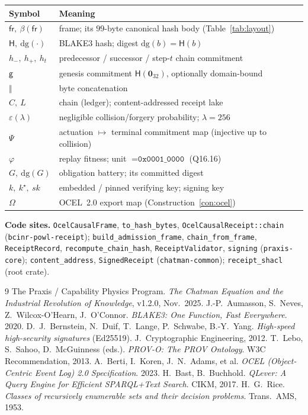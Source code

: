 \documentclass[11pt,oneside]{book}
\theoremstyle{definition}
\theoremstyle{plain}
\theoremstyle{remark}
\newcommand{\chainH}{\mathsf{H}}               %
\newcommand{\Fitness}{\varphi}
\newcommand{\dg}{\mathrm{dg}}                   %
\newcommand{\fr}{\mathsf{fr}}                   %
\newcommand{\body}{\beta}                       %
\newcommand{\code}[1]{\texttt{#1}}
\newcommand{\concat}{\mathbin{\Vert}}           %
\newcommand{\Genesis}{\mathsf{g}}               %
\newcommand{\Lake}{L}                 %
\newcommand{\Ledger}{C}               %
\begin{document}
\begin{tabular}{ll}
\toprule
Symbol & Meaning\\
\midrule
$\fr,\ \body(\fr)$ & frame; its $99$-byte canonical hash body (Table~\ref{tab:layout})\\
$\chainH,\ \dg(\cdot)$ & BLAKE3 hash; digest $\dg(b)=\chainH(b)$\\
$h_{-},\ h_{+},\ h_t$ & predecessor / successor / step-$t$ chain commitment\\
$\Genesis$ & genesis commitment $\chainH(\bm 0_{32})$, optionally domain-bound\\
$\concat$ & byte concatenation\\
$\Ledger,\ \Lake$ & chain (ledger); content-addressed receipt lake\\
$\varepsilon(\lambda)$ & negligible collision/forgery probability; $\lambda=256$\\
$\Psi$ & actuation $\mapsto$ terminal commitment map (injective up to collision)\\
$\Fitness$ & replay fitness; unit $=\code{0x0001\_0000}$ (Q16.16)\\
$G,\ \dg(G)$ & obligation battery; its committed digest\\
$k,\ k^{\star},\ sk$ & embedded / pinned verifying key; signing key\\
$\Omega$ & OCEL~2.0 export map (Construction~\ref{con:ocel})\\
\bottomrule
\end{tabular}

\vspace{1em}
\noindent\textbf{Code sites.} \code{OcelCausalFrame}, \code{to\_hash\_bytes},
\code{OcelCausalReceipt::chain} (\code{bcinr-powl-receipt});
\code{build\_admission\_frame}, \code{chain\_from\_frame}, \code{ReceiptRecord},
\code{recompute\_chain\_hash}, \code{ReceiptValidator}, \code{signing} (\code{praxis-core});
\code{content\_address}, \code{SignedReceipt} (\code{chatman-common}); \code{receipt\_shacl}
(root crate). %

\begin{thebibliography}{9}
 The Praxis / Capability Physics Program.
\emph{The Chatman Equation and the Industrial Revolution of Knowledge}, v1.2.0, Nov.\ 2025.
 J.-P.\ Aumasson, S.\ Neves, Z.\ Wilcox-O'Hearn, J.\ O'Connor.
\emph{BLAKE3: One Function, Fast Everywhere}. 2020.
 D.\ J.\ Bernstein, N.\ Duif, T.\ Lange, P.\ Schwabe, B.-Y.\ Yang.
\emph{High-speed high-security signatures} (Ed25519). J.\ Cryptographic Engineering, 2012.
 T.\ Lebo, S.\ Sahoo, D.\ McGuinness (eds.).
\emph{PROV-O: The PROV Ontology}. W3C Recommendation, 2013.
 A.\ Berti, I.\ Koren, J.\ N.\ Adams, et al.
\emph{OCEL (Object-Centric Event Log) 2.0 Specification}. 2023.
 H.\ Bast, B.\ Buchhold.
\emph{QLever: A Query Engine for Efficient SPARQL+Text Search}. CIKM, 2017.
 H.\ G.\ Rice.
\emph{Classes of recursively enumerable sets and their decision problems}.
Trans.\ AMS, 1953.
\end{thebibliography}
\end{document}
